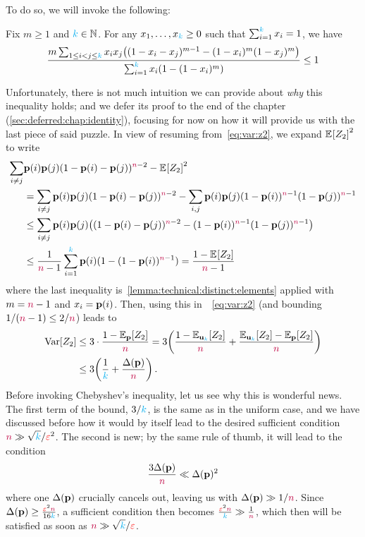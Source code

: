 To do so, we will invoke the following:
\begin{lemma}
  \label{lemma:technical:distinct:elements}
Fix $m \geq 1$ and ${\textcolor{cyan}{k}} \in \mathbb{N}$. For any $x_1,\dots,x_{\textcolor{cyan}{k}} \geq 0$ such that $\sum_{i=1}^{\textcolor{cyan}{k}} x_i = 1$, we have
\[
    \frac{m\sum_{1\leq i < j \leq \ab} x_i x_j \Paren{ (1-x_i - x_j)^{m-1} - (1-x_i)^m(1-x_j)^m} }{\sum_{i=1}^\ab x_i (1-(1-x_i)^m)} \leq 1
\]
\end{lemma}
Unfortunately, there is not much intuition we can provide about \emph{why} this inequality holds; and we defer its proof to the end of the chapter (\cref{sec:deferred:chap:identity}), focusing for now on how it will provide us with the last piece of said puzzle. In view of resuming from~\cref{eq:var:z2}, we expand $\bEE{Z_2}^2$ to write
\begin{align*}
\sum_{i\neq j} &\p(i)\p(j)(1-\p(i)-\p(j))^{\ns-2} - \bEE{Z_2}^2  \\
&= \sum_{i\neq j} \p(i)\p(j)(1-\p(i)-\p(j))^{\ns-2} - \sum_{i,j} \p(i)\p(j)(1-\p(i))^{\ns-1}(1-\p(j))^{\ns-1} \\
&\leq \sum_{i\neq j} \p(i)\p(j)\Paren{ (1-\p(i)-\p(j))^{\ns-2} - (1-\p(i))^{\ns-1}(1-\p(j))^{\ns-1} } \\
&\leq \frac{1}{\ns-1} \sum_{i=1}^\ab \p(i) (1-(1-\p(i))^{\ns-1}) = \frac{1-\bEE{Z_2}}{\ns-1}
\end{align*}
where the last inequality is~\cref{lemma:technical:distinct:elements} applied with $m={\textcolor{purple}{n}}-1$ and $x_i = \mathbf{p}(i)$. Then, using this in~~\cref{eq:var:z2} (and bounding $1/({\textcolor{purple}{n}}-1) \leq 2/{\textcolor{purple}{n}}$) leads to 
\begin{align}
\Var[Z_2]
&\leq 3\cdot \frac{1-\bE{\p}{Z_2}}{\ns} 
= 3\Paren{ \frac{1-\bE{\uniform_{\ab}}{Z_2}}{\ns} + \frac{\bE{\uniform_{\ab}}{Z_2}-\bE{\p}{Z_2}}{\ns} }  \notag\\
&\leq 3\Paren{ \frac{1}{\ab} + \frac{\Delta(\p)}{\ns} }\,. \label{eq:var:z2:final}
\end{align}
Before invoking Chebyshev's inequality, let us see why this is wonderful news. The first term of the bound, $3/{\textcolor{cyan}{k}}$, is the same as in the uniform case, and we have discussed before how it would by itself lead to the desired sufficient condition ${\textcolor{purple}{n}} \gg \sqrt{{\textcolor{cyan}{k}}}/\textcolor{red}{\varepsilon}^2$. The second is new; by the same rule of thumb, it will lead to the condition
\[
    \frac{3\Delta(\mathbf{p})}{{\textcolor{purple}{n}}} \ll \Delta(\mathbf{p})^2
\]
where one $\Delta(\mathbf{p})$ crucially cancels out, leaving us with $\Delta(\mathbf{p}) \gg 1/{\textcolor{purple}{n}}$. Since $\Delta(\mathbf{p})\geq \frac{\textcolor{red}{\varepsilon}^2{\textcolor{purple}{n}}}{16{\textcolor{cyan}{k}}}$, a sufficient condition then becomes $\frac{\textcolor{red}{\varepsilon}^2{\textcolor{purple}{n}}}{{\textcolor{cyan}{k}}} \gg \frac{1}{{\textcolor{purple}{n}}}$, which then will be satisfied as soon as ${\textcolor{purple}{n}} \gg \sqrt{{\textcolor{cyan}{k}}}/\textcolor{red}{\varepsilon}$.

